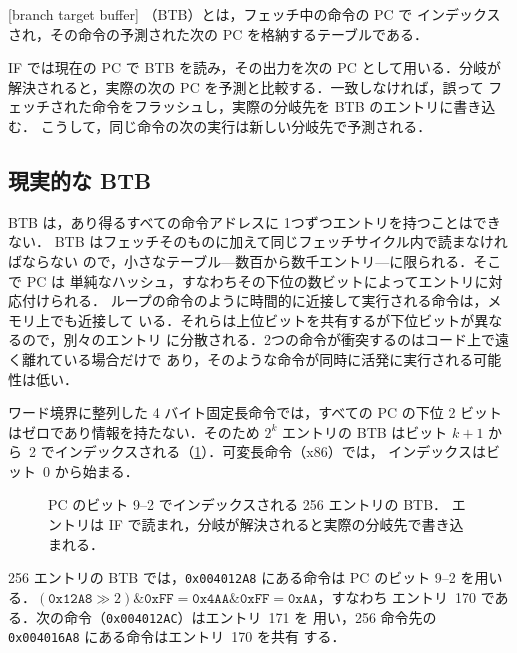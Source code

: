 \documentclass[../main.tex]{subfiles}
\begin{document}
\begin{definition}[分岐先バッファ]
  [branch target buffer]%
  （BTB）とは，フェッチ中の命令の PC で
  インデックスされ，その命令の予測された次の PC を格納するテーブルである．
\end{definition}

IF では現在の PC で BTB を読み，その出力を次の PC として用いる．分岐が
解決されると，実際の次の PC を予測と比較する．一致しなければ，誤って
フェッチされた命令をフラッシュし，実際の分岐先を BTB のエントリに書き込む．
こうして，同じ命令の次の実行は新しい分岐先で予測される．

\subsection{現実的な BTB}

BTB は，あり得るすべての命令アドレスに 1つずつエントリを持つことはできない．
BTB はフェッチそのものに加えて同じフェッチサイクル内で読まなければならない
ので，小さなテーブル---数百から数千エントリ---に限られる．そこで PC は
単純なハッシュ，すなわちその下位の数ビットによってエントリに対応付けられる．
ループの命令のように時間的に近接して実行される命令は，メモリ上でも近接して
いる．それらは上位ビットを共有するが下位ビットが異なるので，別々のエントリ
に分散される．2つの命令が衝突するのはコード上で遠く離れている場合だけで
あり，そのような命令が同時に活発に実行される可能性は低い．

ワード境界に整列した 4 バイト固定長命令では，すべての PC の下位 2 ビット
はゼロであり情報を持たない．そのため $2^k$ エントリの BTB はビット $k+1$
から~2 でインデックスされる（\cref{fig:l04-btb}）．可変長命令（x86）では，
インデックスはビット~0 から始まる．

\begin{figure}[htbp]
  \centering
  
  \caption{PC のビット 9--2 でインデックスされる 256 エントリの BTB．
    エントリは IF で読まれ，分岐が解決されると実際の分岐先で書き込まれる．}
  \label{fig:l04-btb}
\end{figure}

\begin{example}
  \label{ex:l04-btb-index}
  256 エントリの BTB では，\texttt{0x004012A8} にある命令は PC のビット
  9--2 を用いる．$(\texttt{0x12A8} \gg 2) \mathbin{\&} \texttt{0xFF} =
  \texttt{0x4AA} \mathbin{\&} \texttt{0xFF} = \texttt{0xAA}$，すなわち
  エントリ~170 である．次の命令（\texttt{0x004012AC}）はエントリ~171 を
  用い，256 命令先の \texttt{0x004016A8} にある命令はエントリ~170 を共有
  する．
\end{example}
\end{document}
